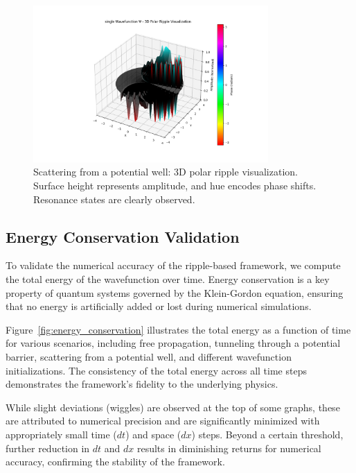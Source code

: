 \documentclass[12pt]{article}
\begin{document}
\begin{figure}[H]
\centering
\includegraphics[width=0.8\textwidth]{images/scattering_wavefunction_3d_polar_probability_density_with_phase.png}
\caption{Scattering from a potential well: 3D polar ripple visualization. Surface height represents amplitude, and hue encodes phase shifts. Resonance states are clearly observed.}
\label{fig:scattering_3d_polar}
\end{figure}

\subsection{Energy Conservation Validation}

To validate the numerical accuracy of the ripple-based framework, we compute the total energy of the wavefunction over time. Energy conservation is a key property of quantum systems governed by the Klein-Gordon equation, ensuring that no energy is artificially added or lost during numerical simulations.

Figure~\ref{fig:energy_conservation} illustrates the total energy as a function of time for various scenarios, including free propagation, tunneling through a potential barrier, scattering from a potential well, and different wavefunction initializations. The consistency of the total energy across all time steps demonstrates the framework’s fidelity to the underlying physics. 

While slight deviations (wiggles) are observed at the top of some graphs, these are attributed to numerical precision and are significantly minimized with appropriately small time (\(dt\)) and space (\(dx\)) steps. Beyond a certain threshold, further reduction in \(dt\) and \(dx\) results in diminishing returns for numerical accuracy, confirming the stability of the framework.
\end{document}
